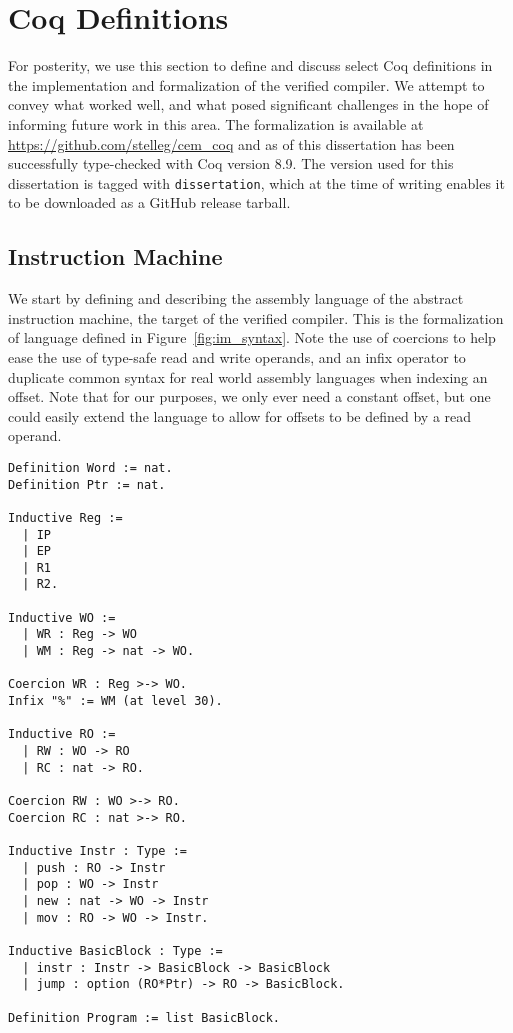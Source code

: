 \chapter{Coq Definitions}

For posterity, we use this section to define and discuss select Coq definitions
in the implementation and formalization of the verified compiler. We attempt to
convey what worked well, and what posed significant challenges in the hope of
informing future work in this area. The formalization is available at
\url{https://github.com/stelleg/cem\_coq} and as of this dissertation has been
successfully type-checked with Coq version 8.9. The version used for this
dissertation is tagged with \texttt{dissertation}, which at the time of writing
enables it to be downloaded as a GitHub release tarball.

\section{Instruction Machine} 

We start by defining and describing the assembly language of the abstract
instruction machine, the target of the verified compiler. This is the
formalization of language defined in Figure~\ref{fig:im_syntax}. Note the use of
coercions to help ease the use of type-safe read and write operands, and an
infix operator to duplicate common syntax for real world assembly languages when
indexing an offset. Note that for our purposes, we only ever need a constant
offset, but one could easily extend the language to allow for offsets to be
defined by a read operand.  

\begin{verbatim}
Definition Word := nat.
Definition Ptr := nat.

Inductive Reg := 
  | IP
  | EP
  | R1
  | R2.

Inductive WO := 
  | WR : Reg -> WO
  | WM : Reg -> nat -> WO.

Coercion WR : Reg >-> WO.
Infix "%" := WM (at level 30).

Inductive RO := 
  | RW : WO -> RO
  | RC : nat -> RO.

Coercion RW : WO >-> RO.
Coercion RC : nat >-> RO.

Inductive Instr : Type :=
  | push : RO -> Instr
  | pop : WO -> Instr
  | new : nat -> WO -> Instr 
  | mov : RO -> WO -> Instr.

Inductive BasicBlock : Type :=
  | instr : Instr -> BasicBlock -> BasicBlock
  | jump : option (RO*Ptr) -> RO -> BasicBlock.

Definition Program := list BasicBlock.
\end{verbatim}


